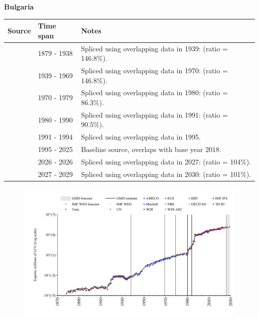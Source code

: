 \documentclass[12pt,a4paper,landscape]{article}
\begin{document}
\begin{adjustbox}{max totalsize={\paperwidth}{\paperheight},center}
\begin{minipage}[t][\textheight][t]{\textwidth}
\vspace*{0.5cm}
{}
\begin{center}
{\Large\bfseries Bulgaria}
\end{center}
\vspace{0.5cm}
\begin{table}[H]
\centering
\small
\begin{tabular}{|l|l|l|}
\hline
\textbf{Source} & \textbf{Time span} & \textbf{Notes} \\
\hline
\rowcolor{white}\cite{Tena}& 1879 - 1938 &Spliced using overlapping data in 1939: (ratio = 146.8\%).\\
\rowcolor{lightgray}\cite{Mitchell}& 1939 - 1969 &Spliced using overlapping data in 1970: (ratio = 146.8\%).\\
\rowcolor{white}\cite{UN}& 1970 - 1979 &Spliced using overlapping data in 1980: (ratio = 86.3\%).\\
\rowcolor{lightgray}\cite{WDI}& 1980 - 1990 &Spliced using overlapping data in 1991: (ratio = 90.5\%).\\
\rowcolor{white}\cite{AMECO}& 1991 - 1994 &Spliced using overlapping data in 1995.\\
\rowcolor{lightgray}\cite{OECD_EO}& 1995 - 2025 &Baseline source, overlaps with base year 2018.\\
\rowcolor{white}\cite{AMECO}& 2026 - 2026 &Spliced using overlapping data in 2027: (ratio = 104\%).\\
\rowcolor{lightgray}\cite{IMF_WEO_forecast}& 2027 - 2029 &Spliced using overlapping data in 2030: (ratio = 101\%).\\
\hline
\end{tabular}
\end{table}
\begin{figure}[H]
\centering
\includegraphics[width=\textwidth,height=0.6\textheight,keepaspectratio]{graphs/BGR_exports.pdf}
\end{figure}
\end{minipage}
\end{adjustbox}
\end{document}
